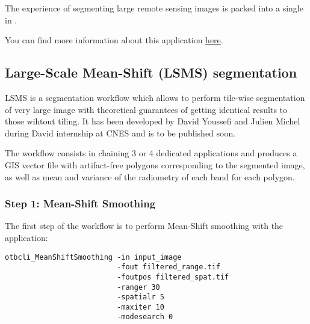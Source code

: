 The experience of segmenting large remote sensing images is packed into a single
 in \app.

You can find more information about this application
\href{http://blog.orfeo-toolbox.org/preview/coming-next-large-scale-segmentation}{here}.





\subsection{Large-Scale Mean-Shift (LSMS) segmentation}

LSMS is a segmentation workflow which allows to perform tile-wise
segmentation of very large image with theoretical guarantees of
getting identical results to those wihtout tiling. It has been
developed by David Youssefi and Julien Michel during David internship
at CNES and is to be published soon.

The workflow consists in chaining 3 or 4 dedicated applications and
produces a GIS vector file with artifact-free polygons corresponding
to the segmented image, as well as mean and variance of the radiometry
of each band for each polygon.

\subsubsection{Step 1: Mean-Shift Smoothing}

The first step of the workflow is to perform Mean-Shift smoothing with
the  application:

\begin{verbatim}
otbcli_MeanShiftSmoothing -in input_image 
                          -fout filtered_range.tif 
                          -foutpos filtered_spat.tif 
                          -ranger 30 
                          -spatialr 5 
                          -maxiter 10 
                          -modesearch 0
\end{verbatim}

